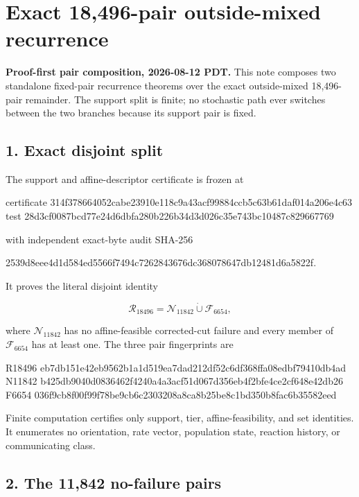 \section{Exact 18,496-pair outside-mixed
recurrence}

\textbf{Proof-first pair composition, 2026-08-12 PDT.} This note
composes two standalone fixed-pair recurrence theorems over the exact
outside-mixed 18,496-pair remainder. The support split is finite; no
stochastic path ever switches between the two branches because its
support pair is fixed.

\subsection{1. Exact disjoint split}

The support and affine-descriptor certificate is frozen at

\begin{CodeBlock}
certificate 314f378664052cabe23910e118c9a43acf99884ccb5c63b61daf014a206e4c63
test        28d3cf0087bcd77e24d6dbfa280b226b34d3d026c35e743bc10487c829667769
\end{CodeBlock}

with independent exact-byte audit SHA-256

\begin{CodeBlock}
2539d8eee4d1d584ed5566f7494c7262843676dc368078647db12481d6a5822f.
\end{CodeBlock}

It proves the literal disjoint identity

\[
  \mathcal R_{18496}
  =\mathcal N_{11842}\mathbin{\dot\cup}\mathcal F_{6654}, \tag{1.1}
\]

where \(\mathcal N_{11842}\) has no affine-feasible corrected-cut
failure and every member of \(\mathcal F_{6654}\) has at least one. The
three pair fingerprints are

\begin{CodeBlock}
R18496 eb7db151e42eb9562b1a1d519ea7dad212df52c6df368ffa08edbf79410db4ad
N11842 b425db9040d0836462f4240a4a3acf51d067d356eb4f2bfe4ce2cf648e42db26
F6654  036f9cb8f00f99f78be9cb6c2303208a8ca8b25be8c1bd350b8fac6b35582eed
\end{CodeBlock}

Finite computation certifies only support, tier, affine-feasibility, and
set identities. It enumerates no orientation, rate vector, population
state, reaction history, or communicating class.

\subsection{2. The 11,842 no-failure
pairs}

